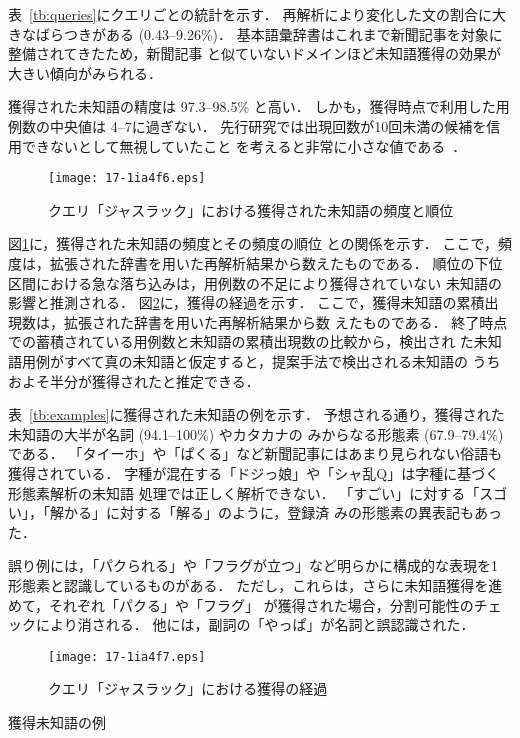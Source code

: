 \documentclass[japanese]{jnlp_1.4}
\begin{document}
表~\ref{tb:queries}にクエリごとの統計を示す．
再解析により変化した文の割合に大きなばらつきがある (0.43--9.26\%)．
基本語彙辞書はこれまで新聞記事を対象に整備されてきたため，新聞記事
と似ていないドメインほど未知語獲得の効果が大きい傾向がみられる．

獲得された未知語の精度は 97.3--98.5\% と高い．
しかも，獲得時点で利用した用例数の中央値は 4--7に過ぎない．
先行研究では出現回数が10回未満の候補を信用できないとして無視していたこと
を考えると非常に小さな値である~\cite{Mori1996full}．

\begin{figure}[b]
\vspace{-1\baselineskip}
\begin{center}
\texttt{[image: 17-1ia4f6.eps]}
\end{center}
 \caption{クエリ「ジャスラック」における獲得された未知語の頻度と順位}
 \label{fig:frequency}
\end{figure}

図\ref{fig:frequency}に，獲得された未知語の頻度とその頻度の順位
との関係を示す．
ここで，頻度は，拡張された辞書を用いた再解析結果から数えたものである．
順位の下位区間における急な落ち込みは，用例数の不足により獲得されていない
未知語の影響と推測される．
図\ref{fig:process}に，獲得の経過を示す．
ここで，獲得未知語の累積出現数は，拡張された辞書を用いた再解析結果から数
えたものである．
終了時点での蓄積されている用例数と未知語の累積出現数の比較から，検出され
た未知語用例がすべて真の未知語と仮定すると，提案手法で検出される未知語の
うちおよそ半分が獲得されたと推定できる．


表~\ref{tb:examples}に獲得された未知語の例を示す．
予想される通り，獲得された未知語の大半が名詞 (94.1--100\%) やカタカナの
みからなる形態素 (67.9--79.4\%) である．
「タイーホ」や「ぱくる」など新聞記事にはあまり見られない俗語も獲得されている．
字種が混在する「ドジっ娘」や「シャ乱Q」は字種に基づく形態素解析の未知語
処理では正しく解析できない．
「すごい」に対する「スゴい」，「解かる」に対する「解る」のように，登録済
みの形態素の異表記もあった．

誤り例には，「パクられる」や「フラグが立つ」など明らかに構成的な表現を1
形態素と認識しているものがある．
ただし，これらは，さらに未知語獲得を進めて，それぞれ「パクる」や「フラグ」
が獲得された場合，分割可能性のチェックにより消される．
他には，副詞の「やっぱ」が名詞と誤認識された．

\begin{figure}[t]
\begin{center}
\texttt{[image: 17-1ia4f7.eps]}
\end{center}
 \caption{クエリ「ジャスラック」における獲得の経過}
 \label{fig:process}
\end{figure}
\begin{table}[t]
    \caption{獲得未知語の例}
    \label{tb:examples}

\end{table}
\end{document}
